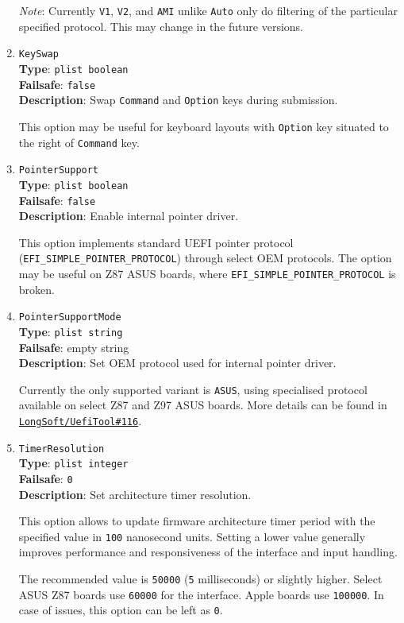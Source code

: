 \documentclass[]{article}
\begin{document}
\begin{enumerate}
  \emph{Note}: Currently \texttt{V1}, \texttt{V2}, and \texttt{AMI} unlike \texttt{Auto} only do filtering of
  the particular specified protocol. This may change in the future versions.

\item
  \texttt{KeySwap}\\
  \textbf{Type}: \texttt{plist\ boolean}\\
  \textbf{Failsafe}: \texttt{false}\\
  \textbf{Description}: Swap \texttt{Command} and \texttt{Option} keys during submission.

  This option may be useful for keyboard layouts with \texttt{Option} key situated to the right
  of \texttt{Command} key.

\item
  \texttt{PointerSupport}\\
  \textbf{Type}: \texttt{plist\ boolean}\\
  \textbf{Failsafe}: \texttt{false}\\
  \textbf{Description}: Enable internal pointer driver.

  This option implements standard UEFI pointer protocol (\texttt{EFI\_SIMPLE\_POINTER\_PROTOCOL})
  through select OEM protocols. The option may be useful on Z87 ASUS boards, where
  \texttt{EFI\_SIMPLE\_POINTER\_PROTOCOL} is broken.

\item
  \texttt{PointerSupportMode}\\
  \textbf{Type}: \texttt{plist\ string}\\
  \textbf{Failsafe}: empty string\\
  \textbf{Description}: Set OEM protocol used for internal pointer driver.

  Currently the only supported variant is \texttt{ASUS}, using specialised protocol available
  on select Z87 and Z97 ASUS boards. More details can be found in
  \href{https://github.com/LongSoft/UEFITool/pull/116}{\texttt{LongSoft/UefiTool\#116}}.

\item
  \texttt{TimerResolution}\\
  \textbf{Type}: \texttt{plist\ integer}\\
  \textbf{Failsafe}: \texttt{0}\\
  \textbf{Description}: Set architecture timer resolution.

  This option allows to update firmware architecture timer period with the specified value
  in \texttt{100} nanosecond units. Setting a lower value generally improves performance
  and responsiveness of the interface and input handling.

  The recommended value is \texttt{50000} (\texttt{5} milliseconds) or slightly higher. Select
  ASUS Z87 boards use \texttt{60000} for the interface. Apple boards use \texttt{100000}.
  In case of issues, this option can be left as \texttt{0}.

\end{enumerate}
\end{document}
